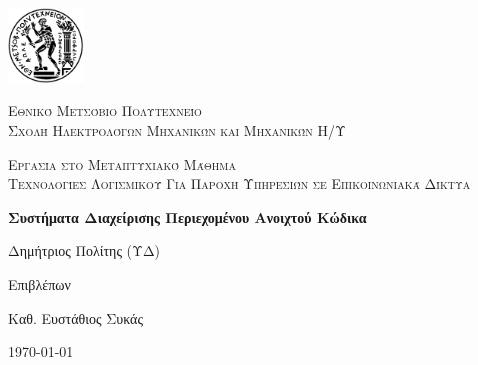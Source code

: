 \documentclass[12pt]{report}
\newcommand\blankpage{%
    \null
    \thispagestyle{empty}%
    \addtocounter{page}{-1}%
    \newpage}
\begin{document}

\hypersetup{pageanchor=false}

\begin{titlepage}
  \centering
  \includegraphics[width=0.15\textwidth]{pyrforos}\par\vspace{1cm}
  {\scshape\LARGE Εθνικό Μετσόβιο Πολυτεχνείο\\
  Σχολή Ηλεκτρολόγων Μηχανικών και Μηχανικών Η/Υ\par}
  \vspace{1cm}
  {\scshape\Large Εργασία στο Μεταπτυχιακό Μάθημα\\
  Τεχνολογίες Λογισμικού Για Παροχή Υπηρεσιών σε Επικοινωνιακά Δίκτυα\par}
  \vspace{1.5cm}
  {\Large\bfseries Συστήματα Διαχείρισης Περιεχομένου Ανοιχτού Κώδικα\par}
  \vspace{2cm}
  {\large Δημήτριος Πολίτης (ΥΔ)\par}
  \vfill
  Επιβλέπων \par
  Καθ. Ευστάθιος Συκάς

  \vfill

  {\large \today\par}
  \afterpage{\blankpage}
\end{titlepage}

\tableofcontents
\thispagestyle{empty}

\listoftables
\thispagestyle{empty}

\listoffigures
\thispagestyle{empty}

\begin{abstract}
Στο παρόν μελετώνται τα λογισμικά ανοιχτού κώδικα, τα οποία αφορούν σε διαχείριση περιεχομένου, με έμφαση στο \textlatin{web content} και τις δυναμικές ιστοσελίδες. Παρουσιάζονται αρχικά τα διαθέσιμα λογισμικά, τα πλεονεκτήματα και μειονεκτήματά τους και στη συνέχεια περιγράφεται αναλυτικά η διαδικασία δημιουργίας ενός ιστοτόπου \textlatin{Drupal} με τη χρήση αυτοματοποιημένων εργαλείων (\textlatin{ansible, vagrant}).

\vspace{10mm}

\noindent \textbf{Λέξεις κλειδιά:} Συστήματα Διαχείρισης Περιεχομένου, Ανοιχτός Κώδικας, Εξυπηρετητής Ιστοσελίδων Διαδίκτυο.
\end{abstract}
\end{document}
